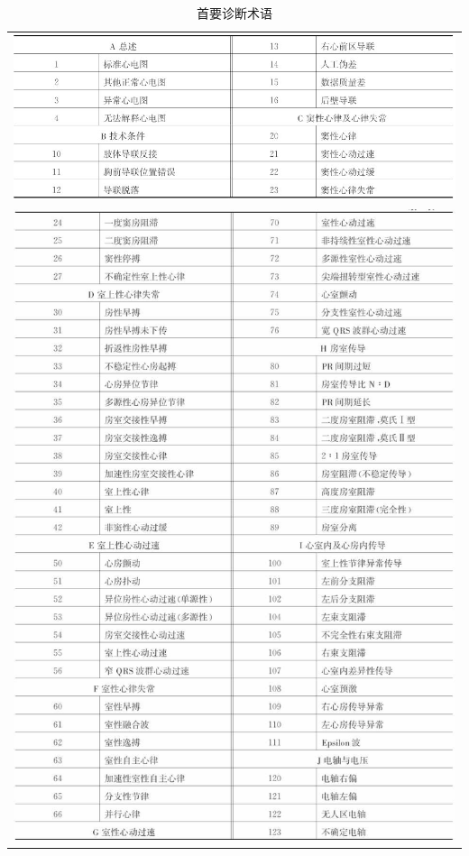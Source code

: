 \begin{longtable}{c}
  \caption{首要诊断术语}
  \label{tab48-1}\\
  \endfirsthead
  \caption[]{首要诊断术语}
  \endhead
\includegraphics[width=\textwidth,height=\textheight,keepaspectratio]{./images/Image00747.jpg}\\
\includegraphics[width=\textwidth,height=\textheight,keepaspectratio]{./images/Image00748.jpg}\\

\end{longtable}
